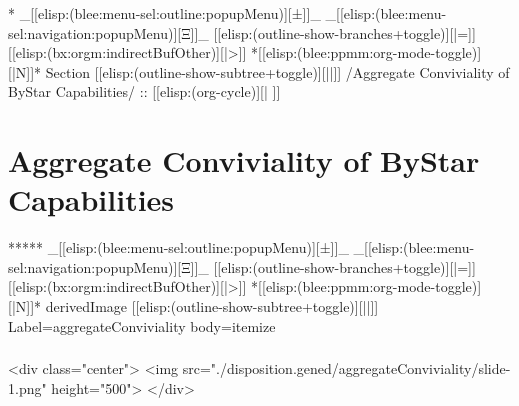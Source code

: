 \begin{whenOrg}
\begin{verblatex}
\begin{frame}[fragile,plain,label=bxContainmentHierarchy]
\end{frame}
\end{verblatex}



\begin{whenOrg}
*  _[[elisp:(blee:menu-sel:outline:popupMenu)][±]]_ _[[elisp:(blee:menu-sel:navigation:popupMenu)][Ξ]]_ [[elisp:(outline-show-branches+toggle)][|=]] [[elisp:(bx:orgm:indirectBufOther)][|>]] *[[elisp:(blee:ppmm:org-mode-toggle)][|N]]*  Section    [[elisp:(outline-show-subtree+toggle)][||]]   /Aggregate Conviviality of ByStar Capabilities/ ::  [[elisp:(org-cycle)][| ]]
\end{whenOrg}

\section{Aggregate Conviviality of ByStar Capabilities}

\begin{whenOrg}
*****  _[[elisp:(blee:menu-sel:outline:popupMenu)][±]]_ _[[elisp:(blee:menu-sel:navigation:popupMenu)][Ξ]]_ [[elisp:(outline-show-branches+toggle)][|=]] [[elisp:(bx:orgm:indirectBufOther)][|>]] *[[elisp:(blee:ppmm:org-mode-toggle)][|N]]*  derivedImage [[elisp:(outline-show-subtree+toggle)][||]] Label=aggregateConviviality  body=itemize
\end{whenOrg}

\begin{htmlonly}

\begin{frame}[fragile,plain,label=aggregateConviviality]
    \frametitle{}
    \framesubtitle{}
    \begin{rawhtml}
<div class="center">
<img src="./disposition.gened/aggregateConviviality/slide-1.png" height="500">
</div>
    \end{rawhtml}
\end{frame}
\end{htmlonly}

\begin{verblatex}


\end{verblatex}
\end{whenOrg}

